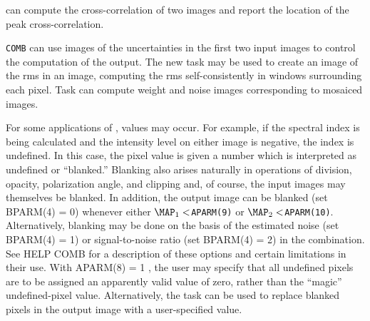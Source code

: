 
{\tt {}} can compute the cross-correlation of two images and
report the location of the peak cross-correlation.

{}

     {\tt COMB} can use images of the uncertainties in the first two
input images to control the computation of the output.  The new task
{\tt {}} may be used to create an image of the rms in an
image, computing the rms self-consistently in windows surrounding each
pixel.  Task {\tt {}} can compute weight and noise images
corresponding to mosaiced images.

     For some applications of {\tt {}},  values may occur.  For example, if the spectral index is being
calculated and the intensity level on either image is negative, the
index is undefined. In this case, the pixel value is given a number
which is interpreted as undefined or ``blanked.''  Blanking also
arises naturally in operations of division, opacity, polarization
angle, and clipping and, of course, the input images may themselves be
blanked.  In addition, the output image can be blanked (set {\us
BPARM(4) = 0}) whenever either ${\MAP}_1 < ${\tt APARM(9)} or
${\MAP}_2 < ${\tt APARM(10)}. Alternatively, blanking may be done on
the basis of the estimated noise (set {\us BPARM(4) = 1}) or
signal-to-noise ratio (set {\us BPARM(4) = 2}) in the combination.
See {\us HELP COMB \CR} for a description of these options and certain
limitations in their use. With {\us APARM(8) = 1 \CR}, the user may
specify that all undefined pixels are to be assigned an apparently
valid value of zero, rather than the ``magic'' undefined-pixel value.
Alternatively,  the task {\tt {}} can be used to replace
blanked pixels in the output image with a user-specified value.


